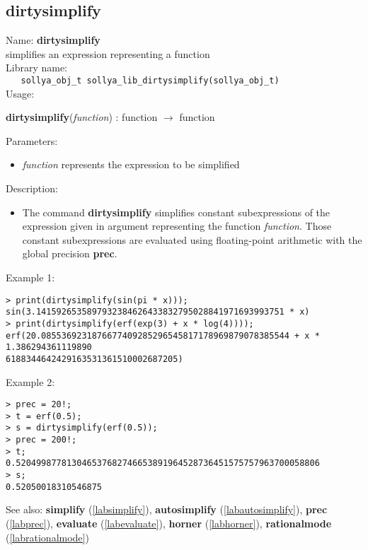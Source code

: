 \subsection{dirtysimplify}
\label{labdirtysimplify}
\noindent Name: \textbf{dirtysimplify}\\
\phantom{aaa}simplifies an expression representing a function\\[0.2cm]
\noindent Library name:\\
\verb|   sollya_obj_t sollya_lib_dirtysimplify(sollya_obj_t)|\\[0.2cm]
\noindent Usage: 
\begin{center}
\textbf{dirtysimplify}(\emph{function}) : \textsf{function} $\rightarrow$ \textsf{function}\\
\end{center}
Parameters: 
\begin{itemize}
\item \emph{function} represents the expression to be simplified
\end{itemize}
\noindent Description: \begin{itemize}

\item The command \textbf{dirtysimplify} simplifies constant subexpressions of the
   expression given in argument representing the function
   \emph{function}. Those constant subexpressions are evaluated using
   floating-point arithmetic with the global precision \textbf{prec}.
\end{itemize}
\noindent Example 1: 
\begin{center}\begin{minipage}{15cm}\begin{Verbatim}[frame=single,commandchars=\\\|\~]
> print(dirtysimplify(sin(pi * x)));
sin(3.1415926535897932384626433832795028841971693993751 * x)
> print(dirtysimplify(erf(exp(3) + x * log(4))));
erf(20.0855369231876677409285296545817178969879078385544 + x * 1.386294361119890
6188344642429163531361510002687205)
\end{Verbatim}
\end{minipage}\end{center}
\noindent Example 2: 
\begin{center}\begin{minipage}{15cm}\begin{Verbatim}[frame=single,commandchars=\\\|\~]
> prec = 20!;
> t = erf(0.5);
> s = dirtysimplify(erf(0.5));
> prec = 200!;
> t;
0.520499877813046537682746653891964528736451575757963700058806
> s;
0.52050018310546875
\end{Verbatim}
\end{minipage}\end{center}
See also: \textbf{simplify} (\ref{labsimplify}), \textbf{autosimplify} (\ref{labautosimplify}), \textbf{prec} (\ref{labprec}), \textbf{evaluate} (\ref{labevaluate}), \textbf{horner} (\ref{labhorner}), \textbf{rationalmode} (\ref{labrationalmode})
